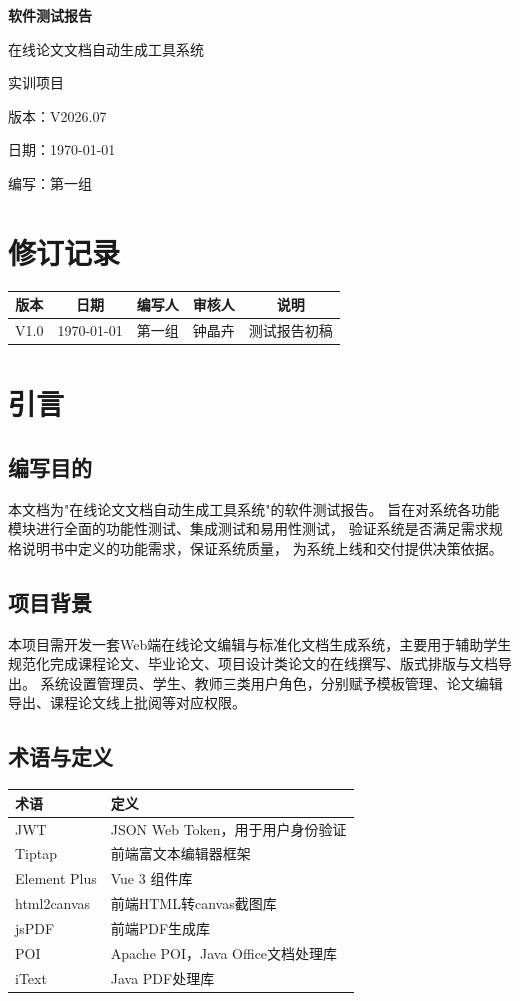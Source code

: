 \documentclass[a4paper,12pt]{article}
\newcommand{\doccover}[1]{
\begin{titlepage}
\centering
\vspace*{3cm}
{\Huge\bfseries #1\par}
\vspace{1.5cm}
{\LARGE 在线论文文档自动生成工具系统\par}
\vspace{0.5cm}
{\Large 实训项目\par}
\vfill
{\large 版本：V2026.07\par}
\vspace{0.3cm}
{\large 日期：\today\par}
\vspace{0.3cm}
{\large 编写：第一组\par}
\vspace{1cm}
\end{titlepage}
}
\begin{document}
\doccover{软件测试报告}

\tableofcontents
\newpage

\section*{修订记录}
\begin{center}
\begin{tabular}{|c|c|c|c|c|}
\hline
版本 & 日期 & 编写人 & 审核人 & 说明 \\
\hline
V1.0 & \today & 第一组 & 钟晶卉 & 测试报告初稿 \\
\hline
\end{tabular}
\end{center}
\newpage

\section{引言}
\subsection{编写目的}
本文档为"在线论文文档自动生成工具系统"的软件测试报告。
旨在对系统各功能模块进行全面的功能性测试、集成测试和易用性测试，
验证系统是否满足需求规格说明书中定义的功能需求，保证系统质量，
为系统上线和交付提供决策依据。

\subsection{项目背景}
本项目需开发一套Web端在线论文编辑与标准化文档生成系统，主要用于辅助学生规范化完成课程论文、毕业论文、项目设计类论文的在线撰写、版式排版与文档导出。
系统设置管理员、学生、教师三类用户角色，分别赋予模板管理、论文编辑导出、课程论文线上批阅等对应权限。

\subsection{术语与定义}
\begin{center}
\begin{tabular}{p{3cm}p{8cm}}
\toprule
术语 & 定义 \\
\midrule
JWT & JSON Web Token，用于用户身份验证 \\
Tiptap & 前端富文本编辑器框架 \\
Element Plus & Vue 3 组件库 \\
html2canvas & 前端HTML转canvas截图库 \\
jsPDF & 前端PDF生成库 \\
POI & Apache POI，Java Office文档处理库 \\
iText & Java PDF处理库 \\
\bottomrule
\end{tabular}
\end{center}
\end{document}

